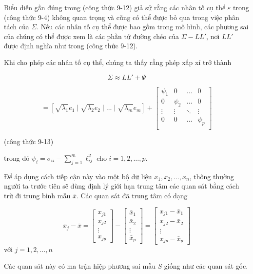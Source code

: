 \documentclass{article}
\begin{document}
Biểu diễn gần đúng trong (công thức 9-12) giả sử rằng các nhân tố cụ thể \( \varepsilon \) trong (công thức 9-4) không quan trọng và cũng có thể được bỏ qua trong việc phân tách của \( \Sigma \). Nếu các nhân tố cụ thể được bao gồm trong mô hình, các phương sai của chúng có thể được xem là các phần tử đường chéo của \( \Sigma - LL' \), nơi \( LL' \) được định nghĩa như trong (công thức 9-12).

Khi cho phép các nhân tố cụ thể, chúng ta thấy rằng phép xấp xỉ trở thành

\[
\Sigma \approx LL' + \Psi
\]

\[
= \left[ \sqrt{\lambda_1} e_1 \mid \sqrt{\lambda_2} e_2 \mid \ldots \mid \sqrt{\lambda_m} e_m \right] + \begin{bmatrix}
\psi_1 & 0 & \ldots & 0 \\
0 & \psi_2 & \ldots & 0 \\
\vdots & \vdots & \ddots & \vdots \\
0 & 0 & \ldots & \psi_p \\
\end{bmatrix}
\]

(công thức 9-13)

trong đó \( \psi_i = \sigma_{ii} - \sum_{j=1}^{m} \ell_{ij}^2 \) cho \( i = 1, 2, \ldots, p \).

Để áp dụng cách tiếp cận này vào một bộ dữ liệu \( x_1, x_2, \ldots, x_n \), thông thường người ta trước tiên sẽ dùng định lý giới hạn trung tâm các quan sát bằng cách trừ đi trung bình mẫu \( \bar{x} \). Các quan sát đã trung tâm có dạng

\[
x_{j} - \bar{x} = 
\begin{bmatrix}
x_{j1} \\
x_{j2} \\
\vdots \\
x_{jp}
\end{bmatrix}
-
\begin{bmatrix}
\bar{x}_1 \\
\bar{x}_2 \\
\vdots \\
\bar{x}_p
\end{bmatrix}
=
\begin{bmatrix}
x_{j1} - \bar{x}_1 \\
x_{j2} - \bar{x}_2 \\
\vdots \\
x_{jp} - \bar{x}_p
\end{bmatrix}
\]
với \( j = 1,2,\ldots,n \)

Các quan sát này có ma trận hiệp phương sai mẫu \( S \) giống như các quan sát gốc.
\end{document}
